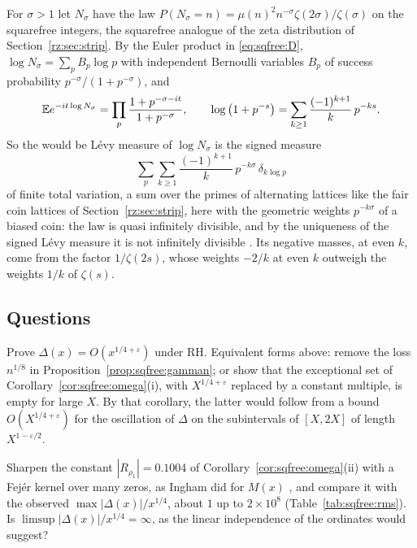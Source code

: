 For $\sigma>1$ let $N_\sigma$ have the law $P(N_\sigma=n)=\mu(n)^2n^{-\sigma}\zeta(2\sigma)/\zeta(\sigma)$ on the squarefree integers, the squarefree analogue of the zeta distribution of Section~\ref{rz:sec:strip}. By the Euler product in \eqref{eq:sqfree:D}, $\log N_\sigma=\sum_pB_p\log p$ with independent Bernoulli variables $B_p$ of success probability $p^{-\sigma}/(1+p^{-\sigma})$, and
\[
\mathbb{E} e^{-it\log N_\sigma}=\prod_p\frac{1+p^{-\sigma-it}}{1+p^{-\sigma}},\qquad \log\big(1+p^{-s}\big)=\sum_{k\ge1}\frac{(-1)^{k+1}}k\,p^{-ks}.
\]
So the would be L\'evy measure of $\log N_\sigma$ is the signed measure
\[
\sum_p\sum_{k\ge1}\frac{(-1)^{k+1}}k\,p^{-k\sigma}\,\delta_{k\log p}
\]
of finite total variation, a sum over the primes of alternating lattices like the fair coin lattices of Section~\ref{rz:sec:strip}, here with the geometric weights $p^{-k\sigma}$ of a biased coin: the law is quasi infinitely divisible, and by the uniqueness of the signed L\'evy measure it is not infinitely divisible \cite{LPS18}. Its negative masses, at even $k$, come from the factor $1/\zeta(2s)$, whose weights $-2/k$ at even $k$ outweigh the weights $1/k$ of $\zeta(s)$.

\subsection{Questions}\label{sec:sqfree:questions}

\begin{question}\label{q:sqfree:pointwise}
Prove $\Delta(x)=O(x^{1/4+\varepsilon})$ under RH. Equivalent forms above: remove the loss $n^{1/8}$ in Proposition~\ref{prop:sqfree:gamman}; or show that the exceptional set of Corollary~\ref{cor:sqfree:omega}(i), with $X^{1/4+\varepsilon}$ replaced by a constant multiple, is empty for large $X$. By that corollary, the latter would follow from a bound $O(X^{1/4+\varepsilon})$ for the oscillation of $\Delta$ on the subintervals of $[X,2X]$ of length $X^{1-\varepsilon/2}$.
\end{question}

\begin{question}\label{q:sqfree:fejer}
Sharpen the constant $|R_{\rho_1}|=0.1004$ of Corollary~\ref{cor:sqfree:omega}(ii) with a Fej\'er kernel over many zeros, as Ingham did for $M(x)$ \cite{Ingham42}, and compare it with the observed $\max|\Delta(x)|/x^{1/4}$, about $1$ up to $2\times10^8$ (Table~\ref{tab:sqfree:rms}). Is $\limsup|\Delta(x)|/x^{1/4}=\infty$, as the linear independence of the ordinates would suggest?
\end{question}
